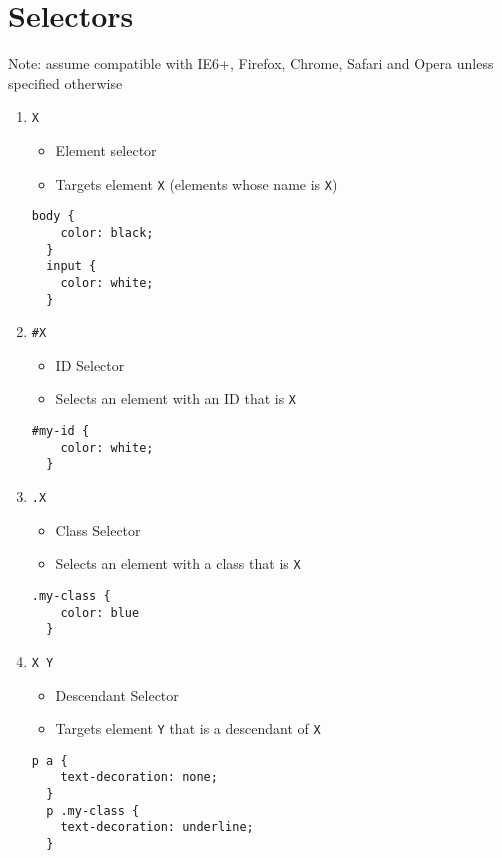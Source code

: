 \documentclass[10pt, twocolumn]{article}
\begin{document}
\section{Selectors}
Note: assume compatible with IE6+, Firefox, Chrome, Safari and Opera unless specified otherwise

\begin{enumerate}
\item {\texttt{X}}
  \begin{itemize}
    \item Element selector
    \item Targets element \texttt{X} (elements whose name is \texttt{X})
  \end{itemize}
  \begin{lstlisting}[frame=single]
  body {
    color: black;
  }
  input {
    color: white;
  }
  \end{lstlisting}

\item {\texttt{\#X}}
  \begin{itemize}
    \item ID Selector
    \item Selects an element with an ID that is \texttt{X}
  \end{itemize}
  \begin{lstlisting}[frame=single]
  #my-id {
    color: white;
  }
  \end{lstlisting}

\item {\texttt{.X}}
  \begin{itemize}
    \item Class Selector
    \item Selects an element with a class that is \texttt{X}
  \end{itemize}
  \begin{lstlisting}[frame=single]
  .my-class {
    color: blue
  }
  \end{lstlisting}

\item {\texttt{X Y}}
  \begin{itemize}
    \item Descendant Selector
    \item Targets element \texttt{Y} that is a descendant of \texttt{X}
  \end{itemize}
  \begin{lstlisting}[frame=single]
  p a {
    text-decoration: none;
  }
  p .my-class {
    text-decoration: underline;
  }
  \end{lstlisting}


\end{enumerate}
\end{document}
